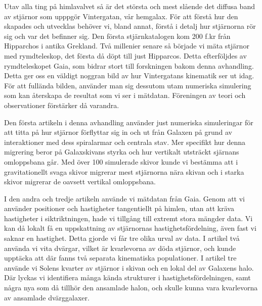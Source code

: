 
Utav alla ting på himlavalvet så är det största och mest slående det diffusa band av stjärnor som upppgör Vintergatan, vår hemgalax. För att förstå hur den skapades och utvecklas behöver vi, bland annat, förstå i detalj hur stjärnorna rör sig och var det befinner sig. Den första stjärnkatalogen kom 200 f.kr från Hipparchos i antika Grekland. Två millenier senare så började vi mäta stjärnor med rymdteleskop, det första då döpt till just Hipparcos. Detta efterföljdes av rymdteleskopet Gaia, som bidrar stort till forskningen bakom denna avhandling. Detta ger oss en väldigt noggran bild av hur Vintergatans kinematik ser ut idag. För att fullända bilden, använder man sig dessutom utam numeriska simulering som kan återskapa de resultat som vi ser i mätdatan. Föreningen av teori och observationer förstärker då varandra. 

Den första artikeln i denna avhandling använder just numeriska simuleringar för att titta på hur stjärnor förflyttar sig in och ut från Galaxen på grund av interaktioner med dess spiralarmar och centrala stav. Mer specifikt hur denna migrering beror på Galaxskivans styrka och hur vertikalt utsträckt sjärnans omloppsbana går. Med över 100 simulerade skivor kunde vi bestämma att i gravitationellt svaga skivor migrerar mest stjärnorna nära skivan och i starka skivor migrerar de oavsett vertikal omloppsbana. 

I den andra och tredje artikeln använde vi mätdatan från Gaia. Genom att vi använder positioner och hastigheter tangentiellt på himlen, utan att kräva hastigheter i siktriktningen, hade vi tillgång till extremt stora mängder data. Vi kan då lokalt få en uppskattning av stjärnornas hastighetsfördelning, även fast vi saknar en hastighet. Detta gjorde vi får tre olika urval av data. I artikel två använda vi vita dvärgar, vilket är kvarlevorna av döda stjärnor, och kunde upptäcka att där fanns två separata kinematiska populationer. I artikel tre använde vi Solens kvarter av stjärnor i skivan och en lokal del av Galaxens halo. Där lyckas vi identifiera många kända strukturer i hastighetsfördelningen, samt några nya som då tillhör den ansamlade halon, och skulle kunna vara kvarlevorna av ansamlade dvärggalaxer. 
